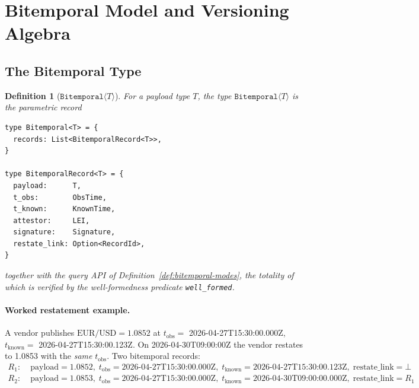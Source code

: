 \documentclass[11pt,a4paper]{article}
\newtheorem{definition}{Definition}[section]
\begin{document}
\clearpage
\section{Bitemporal Model and Versioning Algebra}
\label{sec:bitemporal}

\subsection{The Bitemporal Type}
\label{sec:bitemporal-type}

\begin{definition}[$\texttt{Bitemporal}\langle T \rangle$]
\label{def:bitemporal-type}
For a payload type $T$, the type $\texttt{Bitemporal}\langle T \rangle$ is the parametric record
\begin{lstlisting}
type Bitemporal<T> = {
  records: List<BitemporalRecord<T>>,
}

type BitemporalRecord<T> = {
  payload:      T,
  t_obs:        ObsTime,
  t_known:      KnownTime,
  attestor:     LEI,
  signature:    Signature,
  restate_link: Option<RecordId>,
}
\end{lstlisting}
together with the query API of Definition~\ref{def:bitemporal-modes}, the totality of which is verified by the well-formedness predicate \texttt{well\_formed}.
\end{definition}

\paragraph{Worked restatement example.} A vendor publishes $\mathrm{EUR}/\mathrm{USD} = 1.0852$ at $t_{\mathrm{obs}} = $ 2026-04-27T15:30:00.000Z, $t_{\mathrm{known}} = $ 2026-04-27T15:30:00.123Z. On 2026-04-30T09:00:00Z the vendor restates to 1.0853 with the \emph{same} $t_{\mathrm{obs}}$. Two bitemporal records:
\[
\begin{aligned}
R_1\!: \; & \text{payload}=1.0852,\; t_{\mathrm{obs}}=\text{2026-04-27T15:30:00.000Z},\; t_{\mathrm{known}}=\text{2026-04-27T15:30:00.123Z},\; \text{restate\_link}=\bot \\
R_2\!: \; & \text{payload}=1.0853,\; t_{\mathrm{obs}}=\text{2026-04-27T15:30:00.000Z},\; t_{\mathrm{known}}=\text{2026-04-30T09:00:00.000Z},\; \text{restate\_link}=R_1
\end{aligned}
\]
\end{document}
